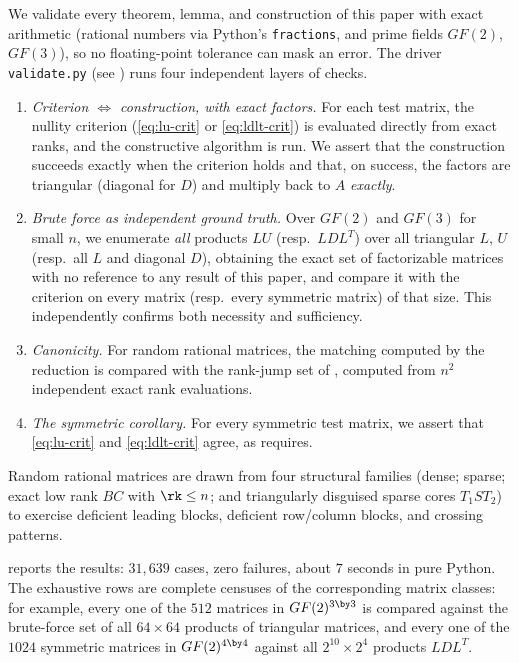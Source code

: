 We validate every theorem, lemma, and construction of this paper with
exact arithmetic (rational numbers via Python's \texttt{fractions}, and
prime fields $GF(2)$, $GF(3)$), so no floating-point tolerance can mask an
error.  The driver \texttt{validate.py} (see )
runs four independent layers of checks.
\begin{enumerate}
  \item \emph{Criterion $\Leftrightarrow$ construction, with exact
    factors.}  For each test matrix, the nullity criterion
    (\cref{eq:lu-crit} or \cref{eq:ldlt-crit}) is evaluated directly from
    exact ranks, and the constructive algorithm is run.  We assert that
    the construction succeeds exactly when the criterion holds and that,
    on success, the factors are triangular (diagonal for $D$) and multiply
    back to $A$ \emph{exactly}.
  \item \emph{Brute force as independent ground truth.}  Over $GF(2)$ and
    $GF(3)$ for small $n$, we enumerate \emph{all} products $LU$ (resp.\
    $LDL^T$) over all triangular $L$, $U$ (resp.\ all $L$ and diagonal
    $D$), obtaining the exact set of factorizable matrices with no
    reference to any result of this paper, and compare it with the
    criterion on every matrix (resp.\ every symmetric matrix) of that
    size.  This independently confirms both necessity and sufficiency.
  \item \emph{Canonicity.}  For random rational matrices, the matching
    computed by the reduction is compared with the rank-jump set of
    \Cref{prop:canonical}, computed from $n^2$ independent exact rank
    evaluations.
  \item \emph{The symmetric corollary.}  For every symmetric test matrix,
    we assert that \cref{eq:lu-crit} and \cref{eq:ldlt-crit} agree, as
    \Cref{cor:sym-lu-ldlt} requires.
\end{enumerate}
Random rational matrices are drawn from four structural families (dense;
sparse; exact low rank $BC$ with $\rk \le n$; and triangularly disguised
sparse cores $T_1 S T_2$) to exercise deficient leading blocks, deficient
row/column blocks, and crossing patterns.

 reports the results: $31{,}639$ cases, zero
failures, about $7$ seconds in pure Python.  The exhaustive rows are
complete censuses of the corresponding matrix classes: for example, every
one of the $512$ matrices in $GF(2)^{3 \by 3}$ is compared against the
brute-force set of all $64 \times 64$ products of triangular matrices, and
every one of the $1024$ symmetric matrices in $GF(2)^{4 \by 4}$ against
all $2^{10} \times 2^4$ products $L D L^T$.

